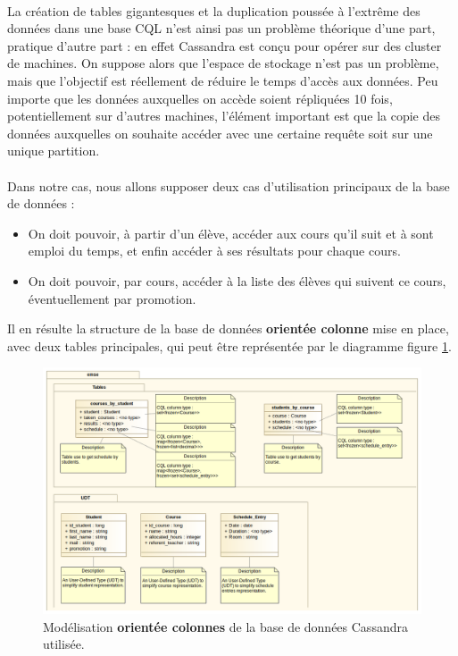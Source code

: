\documentclass[a4paper, 11pt]{article}
\begin{document}
\paragraph{}
La création de tables gigantesques et la duplication poussée à l'extrême des données dans une base CQL n'est ainsi pas un problème théorique d'une part, pratique d'autre part : en effet Cassandra est conçu pour opérer sur des cluster de machines. On suppose alors que l'espace de stockage n'est pas un problème, mais que l'objectif est réellement de réduire le temps d'accès aux données. Peu importe que les données auxquelles on accède soient répliquées 10 fois, potentiellement sur d'autres machines, l'élément important est que la copie des données auxquelles on souhaite accéder avec une certaine requête soit sur une unique partition.

\paragraph{}
Dans notre cas, nous allons supposer deux cas d'utilisation principaux de la base de données :
\begin{itemize}
\item On doit pouvoir, à partir d'un élève, accéder aux cours qu'il suit et à sont emploi du temps, et enfin accéder à ses résultats pour chaque cours.
\item On doit pouvoir, par cours, accéder à la liste des élèves qui suivent ce cours, éventuellement par promotion.
\end{itemize}
Il en résulte la structure de la base de données \textbf{orientée colonne} mise en place, avec deux tables principales, qui peut être représentée par le diagramme figure \ref{column_diagram}. 

\begin{figure}[h]
\centering
\includegraphics[width=\textwidth]{images/column_class_diagram.png}
\caption{Modélisation \textbf{orientée colonnes} de la base de données Cassandra utilisée.}
\label{column_diagram}
\end{figure}
\end{document}
